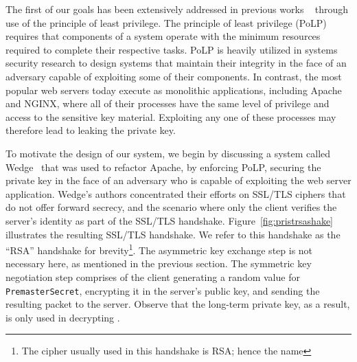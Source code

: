 \documentclass[../main.tex]{subfiles}
\begin{document}
The first of our goals has been extensively addressed in previous
works ~\cite{Bittau08, Krohn2004} through use of the principle of
least privilege. The principle of least privilege (PoLP) requires that
components of a system operate with the minimum resources required to
complete their respective tasks. PoLP is heavily utilized in systems
security research to design systems that maintain their integrity in
the face of an adversary capable of exploiting some of their
components. In contrast, the most popular web servers today execute as
monolithic applications, including Apache and NGINX, where all of
their processes have the same level of privilege and access to the
sensitive key material. Exploiting any one of these processes may
therefore lead to leaking the private key.

To motivate the design of our system, we begin by discussing a system
called Wedge~\cite{Bittau08} that was used to refactor Apache, by
enforcing PoLP, securing the private key in the face of an adversary
who is capable of exploiting the web server application. Wedge's
authors concentrated their efforts on SSL/TLS ciphers that do not
offer forward secrecy, and the scenario where only the client verifies
the server's identity as part of the SSL/TLS handshake.
Figure~\ref{fig:pristrsashake} illustrates the resulting SSL/TLS
handshake. We refer to this handshake as the ``RSA'' handshake for
brevity\footnote{The cipher usually used in this handshake is RSA;
  hence the name}. The asymmetric key exchange step is not necessary
here, as mentioned in the previous section. The symmetric key
negotiation step comprises of the client generating a random value for
\texttt{PremasterSecret}, encrypting it in the server's public key,
and sending the resulting packet to the server. Observe that the
long-term private key, as a result, is only used in decrypting
\premaster.
\end{document}
